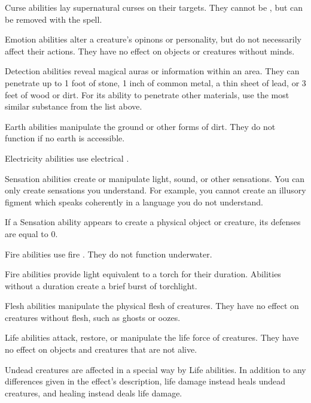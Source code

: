          Curse abilities lay supernatural curses on their targets.
        They cannot be , but can be removed with the  spell.

         Emotion abilities alter a creature's opinons or personality, but do not necessarily affect their actions.
        They have no effect on objects or creatures without minds.

         Detection abilities reveal magical auras or information within an area.
        They can penetrate up to 1 foot of stone, 1 inch of common metal, a thin sheet of lead, or 3 feet of wood or dirt.
        For its ability to penetrate other materials, use the most similar substance from the list above.

         Earth abilities manipulate the ground or other forms of dirt.
        They do not function if no earth is accessible.

         Electricity abilities use electrical .

         Sensation abilities create or manipulate light, sound, or other sensations.
        You can only create sensations you understand.
        For example, you cannot create an illusory figment which speaks coherently in a language you do not understand.
        \par If a Sensation ability appears to create a physical object or creature, its defenses are equal to 0.

         Fire abilities use fire . They do not function underwater.
        \par Fire abilities provide light equivalent to a torch for their duration.
        Abilities without a duration create a brief burst of torchlight.

         Flesh abilities manipulate the physical flesh of creatures.
        They have no effect on creatures without flesh, such as ghosts or oozes.

         Life abilities attack, restore, or manipulate the life force of creatures.
        They have no effect on objects and creatures that are not alive.
        \par Undead creatures are affected in a special way by Life abilities.
        In addition to any differences given in the effect's description, life damage instead heals undead creatures, and healing instead deals life damage.

